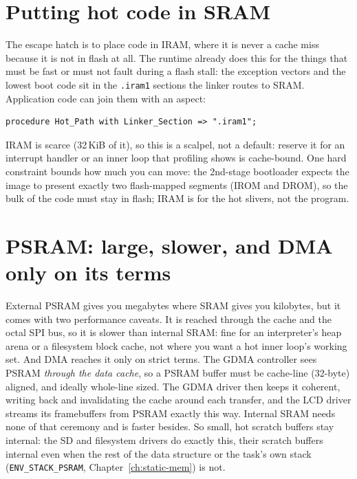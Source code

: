 \section{Putting hot code in SRAM}

The escape hatch is to place code in IRAM, where it is never a cache miss because it
is not in flash at all. The runtime already does this for the things that must be
fast or must not fault during a flash stall: the exception vectors and the lowest
boot code sit in the \texttt{.iram1} sections the linker routes to SRAM. Application
code can join them with an aspect:

\begin{lstlisting}
procedure Hot_Path with Linker_Section => ".iram1";
\end{lstlisting}

IRAM is scarce (32\,KiB of it), so this is a scalpel, not a default: reserve it
for an interrupt handler or an inner loop that profiling shows is cache-bound. One
hard constraint bounds how much you can move: the 2nd-stage bootloader expects the
image to present exactly two flash-mapped segments (IROM and DROM), so the bulk of
the code must stay in flash; IRAM is for the hot slivers, not the program.

\section{PSRAM: large, slower, and DMA only on its terms}

External PSRAM gives you megabytes where SRAM gives you kilobytes, but it comes with
two performance caveats. It is reached through the cache and the octal SPI bus, so it
is slower than internal SRAM: fine for an interpreter's heap arena or a filesystem
block cache, not where you want a hot inner loop's working set. And DMA reaches it
only on strict terms. The GDMA controller sees PSRAM \emph{through the data
cache}, so a PSRAM buffer must be cache-line (32-byte) aligned, and ideally
whole-line sized. The GDMA driver then keeps it coherent, writing back and
invalidating the cache around each transfer, and the LCD driver streams its
framebuffers from PSRAM exactly this way. Internal SRAM needs none of that
ceremony and is faster besides. So small, hot scratch buffers stay internal:
the SD and filesystem drivers do exactly this, their scratch buffers internal
even when the rest of the data structure \textemdash{} or the task's own stack
(\texttt{ENV\_STACK\_PSRAM}, Chapter~\ref{ch:static-mem}) \textemdash{} is not.


